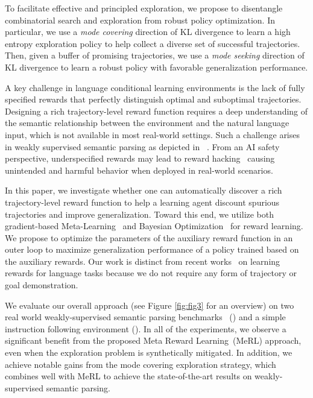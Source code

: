 To facilitate effective and principled exploration,
we propose to disentangle combinatorial search and exploration
from robust policy optimization. In particular, we use a {\em mode
covering} direction of KL divergence to learn a high entropy
exploration policy to help collect a diverse set of successful
trajectories.
Then, given a buffer of promising trajectories,
we use a {\em mode seeking} direction of KL divergence
to learn a robust policy
with favorable generalization performance.

A key challenge in language conditional learning environments is the
lack of fully specified rewards that perfectly distinguish optimal
and suboptimal trajectories.  Designing a rich trajectory-level
reward function requires a deep understanding of the semantic
relationship between the environment and the natural language input,
which is not available in most real-world settings.  Such a challenge
arises in weakly supervised semantic parsing as depicted
in ~\cite{pasupat2015tables}.  From an AI safety
perspective, underspecified rewards may lead to reward
hacking~\cite{amodei2016concrete} causing unintended and harmful
behavior when deployed in real-world scenarios.

In this paper, we investigate whether one can automatically discover a
rich trajectory-level reward function to help a learning agent
discount spurious trajectories and improve generalization.  Toward
this end, we utilize both gradient-based
Meta-Learning~\cite{finn2017model,maclaurin2015gradient} and Bayesian
Optimization~\cite{snoek2012practical} for reward learning. We propose
to optimize the parameters of the auxiliary reward function in an
outer loop to maximize generalization performance of a policy trained
based on the auxiliary rewards. Our work is distinct from recent
works~\cite{bahdanau19, fu19} on learning rewards for language tasks because
we do not require any form of trajectory or goal demonstration.

We evaluate our overall approach (see Figure \ref{fig:fig3} for an
overview) on two real world weakly-supervised semantic parsing
benchmarks~\cite{pasupat2015tables,zhong2017seq2sql}
() and a simple instruction following environment
().  In all of the experiments, we observe a
significant benefit from the proposed Meta Reward Learning~(MeRL)
approach, even when the exploration problem is synthetically
mitigated.  In addition, we achieve notable gains from the mode
covering exploration strategy, which combines well with MeRL to
achieve the state-of-the-art results on weakly-supervised semantic
parsing.

